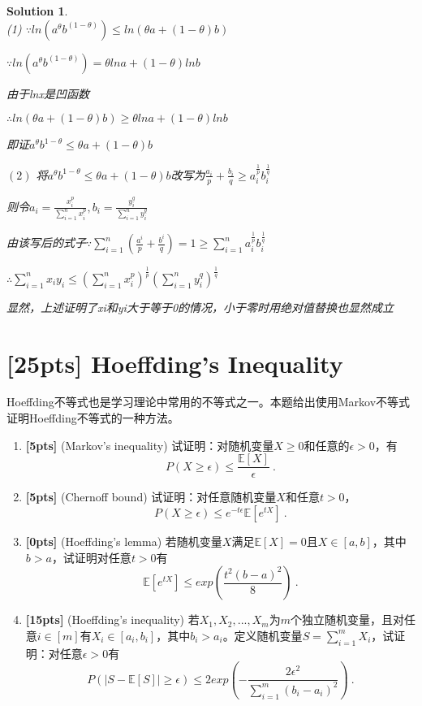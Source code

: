 \documentclass[a4paper,UTF8]{article}
\numberwithin{equation}{section}
\newtheorem*{mySol}{Solution}
\begin{document}
\begin{mySol}~\\ 
	(1) 
	$
	\because ln\left ( a^{\theta } b^{\left ( 1-\theta  \right )}\right )\leq ln\left ( \theta a+\left ( 1-\theta  \right )b \right )$
	
	$\because ln\left ( a^{\theta } b^{\left ( 1-\theta  \right )}\right )= \theta lna+\left ( 1-\theta  \right )lnb$
	
	由于lnx是凹函数
	
	$\therefore ln\left ( \theta a+\left ( 1-\theta  \right )b \right )\geq \theta lna+\left ( 1-\theta  \right )lnb
	$
	
	即证$a^{\theta} b^{1-\theta} \leq \theta a+(1-\theta) b$
	
	\noindent$\displaystyle(2)$
	将$a^{\theta} b^{1-\theta} \leq \theta a+(1-\theta) b$改写为$\frac{a_{i}}{p}+\frac{b_{i}}{q} \geq a_{i}^{\frac{1}{p}}b_{i}^{\frac{1}{q}}$
	
	
	则令$a_{i}=\frac{x_{i}^{p}}{\sum_{i=1}^{n}x_{i}^{p}} ,b_{i}=\frac{y_{i}^{q}}{\sum_{i=1}^{n}y_{i}^{q}}$
	
	
	由该写后的式子$\because \sum_{i=1}^{n}\left (  \frac{a^{i}}{p}+\frac{b^{i}}{q}\right ) =1\geq \sum_{i=1}^{n}a_{i}^{\frac{1}{p}}b_{i}^{\frac{1}{q}}$
	
	
	$\therefore \sum_{i=1}^{n}x_{i} y_{i} \leq \left ( \sum_{i=1}^{n} x_{i}^{p}\right )^{\frac{1}{p}}\left ( \sum_{i=1}^{n} y_{i}^{q}\right )^{\frac{1}{q}}$
	
	
	显然，上述证明了xi和yi大于等于0的情况，小于零时用绝对值替换也显然成立
	
	
	
\end{mySol}
\newpage
\section{[25pts] Hoeffding's Inequality}
	Hoeffding不等式也是学习理论中常用的不等式之一。本题给出使用Markov不等式证明Hoeffding不等式的一种方法。
	\begin{enumerate}[(1)]
		\item \textbf{[5pts]} (Markov's inequality) 试证明：对随机变量$X\geq 0$和任意的$\epsilon>0$，有
			$$ P(X\geq \epsilon)\leq \frac{\mathbb{E}[X]}{\epsilon}~.$$
		\item \textbf{[5pts]} (Chernoff bound) 试证明：对任意随机变量$X$和任意$t>0$，
			$$ P(X\geq \epsilon)\leq e^{-t\epsilon}\mathbb{E}\left[e^{tX}\right] ~.$$
		\item \textbf{[0pts]} (Hoeffding's lemma) 若随机变量$X$满足$\mathbb{E}[X]=0$且$X\in[a, b]$，其中$b>a$，试证明对任意$t>0$有
			$$ \mathbb{E}\left[ e^{tX} \right] \leq exp\left(\frac{t^2(b-a)^2}{8}\right)~. $$
		\item \textbf{[15pts]} (Hoeffding's inequality) 若$X_1, X_2, ..., X_m$为$m$个独立随机变量，且对任意$i\in[m]$有$X_i\in[a_i, b_i]$，其中$b_i>a_i$。定义随机变量$S=\sum_{i=1}^mX_i$，试证明：对任意$\epsilon>0$有
			$$ P(\left|S-\mathbb{E}[S]\right|\geq \epsilon) \leq 2exp\left( -\frac{2\epsilon^2}{\sum_{i=1}^m (b_i-a_i)^2} \right) ~.$$
	\end{enumerate}
\end{document}
